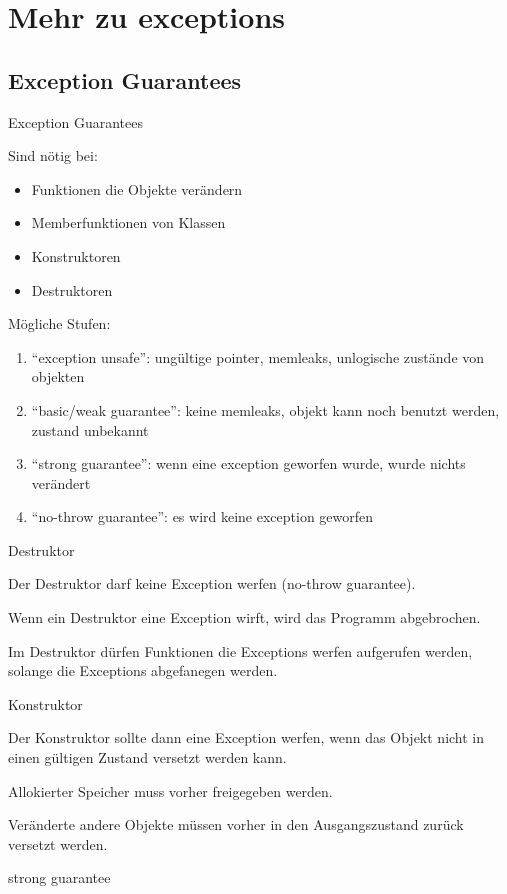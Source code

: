 \section{Mehr zu exceptions}


\subsection{Exception Guarantees}


\begin{frame}{Exception Guarantees}

    Sind nötig bei: 
	\begin{itemize}
		\item Funktionen die Objekte verändern
		\item Memberfunktionen von Klassen
		\item Konstruktoren
		\item Destruktoren
	\end{itemize}
	
	Mögliche Stufen:
	\begin{enumerate}
		\item \enquote{exception unsafe}: ungültige pointer, memleaks, unlogische zustände von objekten
		\item \enquote{basic/weak guarantee}: keine memleaks, objekt kann noch benutzt werden, zustand unbekannt
		\item \enquote{strong guarantee}: wenn eine exception geworfen wurde, wurde nichts verändert
		\item \enquote{no-throw guarantee}: es wird keine exception geworfen
	\end{enumerate}

\end{frame}


\begin{frame}{Destruktor}

    Der Destruktor darf keine Exception werfen (no-throw guarantee).
    
    Wenn ein Destruktor eine Exception wirft, wird das Programm abgebrochen.
    
    Im Destruktor dürfen Funktionen die Exceptions werfen aufgerufen werden, solange die Exceptions abgefanegen werden.

\end{frame}

\begin{frame}{Konstruktor}

    Der Konstruktor sollte dann eine Exception werfen, wenn das Objekt nicht in einen gültigen Zustand versetzt werden kann.
    
    Allokierter Speicher muss vorher freigegeben werden.
    
    Veränderte andere Objekte müssen vorher in den Ausgangszustand zurück versetzt werden.
    
    strong guarantee
    

\end{frame}

